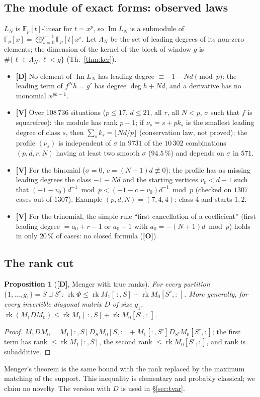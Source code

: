\documentclass[11pt,a4paper]{article}
\newtheorem{proposition}[theorem]{Proposition}
\newcommand{\F}{\mathbb{F}}
\begin{document}
\subsection*{The module of exact forms: observed laws}

$L_N$ is $\F_p[t]$-linear for $t=x^p$, so $\operatorname{Im}L_N$ is a submodule of
$\F_p[x]=\bigoplus_{s=0}^{p-1}\F_p[t]x^s$. Let $\Lambda_N$ be the set of leading
degrees of its non-zero elements; the dimension of the kernel of the block of
window $g$ is $\#\{\ell\in\Lambda_N:\ell<g\}$ (Th.~\ref{thm:ker}).
\begin{itemize}
\item \textbf{[D]} No element of $\operatorname{Im}L_N$ has leading degree
$\equiv-1-Nd\pmod p$: the leading term of $f^Nh=g'$ has degree $\deg h+Nd$, and a
derivative has no monomial $x^{pk-1}$.
\item \textbf{[V]} Over $108\,736$ situations ($p\le17$, $d\le21$, all $r$, all
$N<p$, $\sigma$ such that $f$ is squarefree): the module has rank $p-1$; if
$\nu_s=s+pk_s$ is the smallest leading degree of class $s$, then
$\sum_sk_s=\lfloor Nd/p\rfloor$ (conservation law, not proved); the profile
$(\nu_s)$ is independent of $\sigma$ in $9731$ of the $10\,302$ combinations
$(p,d,r,N)$ having at least two smooth $\sigma$ ($94.5\,\%$) and depends on
$\sigma$ in $571$.
\item \textbf{[V]} For the binomial ($\sigma=0$, $c=(N+1)d\not\equiv0$): the
profile has as missing leading degrees the class $-1-Nd$ and the starting
vertices $v_0<d-1$ such that $(-1-v_0)d^{-1}\bmod p<(-1-c-v_0)d^{-1}\bmod p$
(checked on $1307$ cases out of $1307$). Example $(p,d,N)=(7,4,4)$: class $4$ and
starts $1,2$.
\item \textbf{[V]} For the trinomial, the simple rule ``first cancellation of a
coefficient'' (first leading degree $=a_0+r-1$ or $a_0-1$ with
$a_0=-(N+1)d\bmod p$) holds in only $20\,\%$ of cases: no closed formula
(\textbf{[O]}).
\end{itemize}

\subsection*{The rank cut}

\begin{proposition}[\textbf{[D]}, Menger with true ranks]
\label{prop:cut}
For every partition $\{1,\dots,g_1\}=S\sqcup S^c$:
$\operatorname{rk}\Phi\le\operatorname{rk}M_1[\,:,S]+\operatorname{rk}M_0[S^c,:\,]$.
More generally, for every invertible diagonal matrix $D$ of size $g_1$,
$\operatorname{rk}(M_1DM_0)\le\operatorname{rk}M_1[\,:,S]+\operatorname{rk}M_0[S^c,:\,]$.
\end{proposition}
\begin{proof}
$M_1DM_0=M_1[:,S]D_SM_0[S,:]+M_1[:,S^c]D_{S^c}M_0[S^c,:]$; the first term has rank
$\le\operatorname{rk}M_1[:,S]$, the second rank $\le\operatorname{rk}M_0[S^c,:]$,
and rank is subadditive.
\end{proof}
Menger's theorem is the same bound with the rank replaced by the maximum matching
of the support. This inequality is elementary and probably classical; we claim no
novelty. The version with $D$ is used in \S\ref{sec:tvar}.
\end{document}
